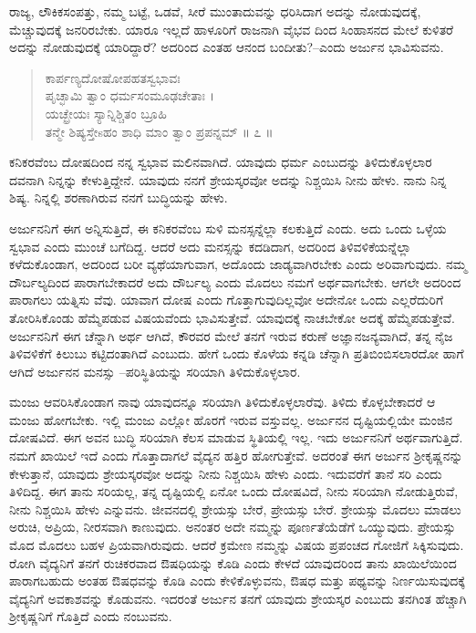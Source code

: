 ರಾಜ್ಯ, ಲೌಕಿಕಸಂಪತ್ತು, ನಮ್ಮ ಬಟ್ಟೆ, ಒಡವೆ, ಸೀರೆ ಮುಂತಾದುವನ್ನು ಧರಿಸಿದಾಗ ಅದನ್ನು ನೋಡುವುದಕ್ಕೆ, ಮೆಚ್ಚುವುದಕ್ಕೆ ಜನರಿರಬೇಕು. ಯಾರೂ ಇಲ್ಲದೆ ಹಾಳೂರಿಗೆ ರಾಜನಾಗಿ ವೈಭವ ದಿಂದ ಸಿಂಹಾಸನದ ಮೇಲೆ ಕುಳಿತರೆ ಅದನ್ನು ನೋಡುವುದಕ್ಕೆ ಯಾರಿದ್ದಾರೆ? ಅದರಿಂದ ಎಂತಹ ಆನಂದ ಬಂದೀತು?–ಎಂದು ಅರ್ಜುನ ಭಾವಿಸುವನು.

\begin{verse}
ಕಾರ್ಪಣ್ಯದೋಷೋಪಹತಸ್ವಭಾವಃ\\ಪೃಚ್ಛಾಮಿ ತ್ವಾಂ ಧರ್ಮಸಂಮೂಢಚೇತಾಃ ।\\ಯಚ್ಛ್ರೇಯಃ ಸ್ಯಾನ್ನಿಶ್ಚಿತಂ ಬ್ರೂಹಿ\\ತನ್ಮೇ ಶಿಷ್ಯಸ್ತೇsಹಂ ಶಾಧಿ ಮಾಂ ತ್ವಾಂ ಪ್ರಪನ್ನಮ್ \num{॥ ೭ ॥}
\end{verse}

{\small ಕನಿಕರವೆಂಬ ದೋಷದಿಂದ ನನ್ನ ಸ್ವಭಾವ ಮಲಿನವಾಗಿದೆ. ಯಾವುದು ಧರ್ಮ ಎಂಬುದನ್ನು ತಿಳಿದುಕೊಳ್ಳಲಾರ ದವನಾಗಿ ನಿನ್ನನ್ನು ಕೇಳುತ್ತಿದ್ದೇನೆ. ಯಾವುದು ನನಗೆ ಶ್ರೇಯಸ್ಕರವೋ ಅದನ್ನು ನಿಶ್ಚಯಿಸಿ ನೀನು ಹೇಳು. ನಾನು ನಿನ್ನ ಶಿಷ್ಯ. ನಿನ್ನಲ್ಲಿ ಶರಣಾಗಿರುವ ನನಗೆ ಬುದ್ಧಿಯನ್ನು ಹೇಳು.}

ಅರ್ಜುನನಿಗೆ ಈಗ ಅನ್ನಿಸುತ್ತಿದೆ, ಈ ಕನಿಕರವೆಂಬ ಸುಳಿ ಮನಸ್ಸನ್ನೆಲ್ಲಾ ಕಲಕುತ್ತಿದೆ ಎಂದು. ಅದು ಒಂದು ಒಳ್ಳೆಯ ಸ್ವಭಾವ ಎಂದು ಮುಂಚೆ ಬಗೆದಿದ್ದ. ಆದರೆ ಅದು ಮನಸ್ಸನ್ನು ಕದಡಿದಾಗ, ಅದರಿಂದ ತಿಳಿವಳಿಕೆಯನ್ನೆಲ್ಲಾ ಕಳೆದುಕೊಂಡಾಗ, ಅದರಿಂದ ಬರೀ ವ್ಯಥೆಯಾಗುವಾಗ, ಅದೊಂದು ಜಾಡ್ಯವಾಗಿರಬೇಕು ಎಂದು ಅರಿವಾಗುವುದು. ನಮ್ಮ ದೌರ್ಬಲ್ಯದಿಂದ ಪಾರಾಗಬೇಕಾದರೆ ಅದು ದೌರ್ಬಲ್ಯ ಎಂದು ಮೊದಲು ನಮಗೆ ಅರ್ಥವಾಗಬೇಕು. ಆಗಲೇ ಅದರಿಂದ ಪಾರಾಗಲು ಯತ್ನಿಸು ವೆವು. ಯಾವಾಗ ದೋಷ ಎಂದು ಗೊತ್ತಾಗುವುದಿಲ್ಲವೋ ಅದೇನೋ ಒಂದು ಎಲ್ಲರೆದುರಿಗೆ ತೋರಿಸಿಕೊಂಡು ಹೆಮ್ಮೆಪಡುವ ವಿಷಯವೆಂದು ಭಾವಿಸುತ್ತೇವೆ. ಯಾವುದಕ್ಕೆ ನಾಚಬೇಕೋ ಅದಕ್ಕೆ ಹೆಮ್ಮೆಪಡುತ್ತೇವೆ. ಅರ್ಜುನನಿಗೆ ಈಗ ಚೆನ್ನಾಗಿ ಅರ್ಥ ಆಗಿದೆ, ಕೌರವರ ಮೇಲೆ ತನಗೆ ಇರುವ ಕರುಣೆ ಅಜ್ಞಾನಜನ್ಯವಾಗಿದೆ, ತನ್ನ ನೈಜ ತಿಳಿವಳಿಕೆಗೆ ಕಿಲುಬು ಕಟ್ಟಿದಂತಾಗಿದೆ ಎಂಬುದು. ಹೇಗೆ ಒಂದು ಕೊಳೆಯ ಕನ್ನಡಿ ಚೆನ್ನಾಗಿ ಪ್ರತಿಬಿಂಬಿಸಲಾರದೋ ಹಾಗೆ ಆಗಿದೆ ಅರ್ಜುನನ ಮನಸ್ಸು –ಪರಿಸ್ಥಿತಿಯನ್ನು ಸರಿಯಾಗಿ ತಿಳಿದುಕೊಳ್ಳಲಾರ.

ಮಂಜು ಆವರಿಸಿಕೊಂಡಾಗ ನಾವು ಯಾವುದನ್ನೂ ಸರಿಯಾಗಿ ತಿಳಿದುಕೊಳ್ಳಲಾರೆವು. ತಿಳಿದು ಕೊಳ್ಳಬೇಕಾದರೆ ಆ ಮಂಜು ಹೋಗಬೇಕು. ಇಲ್ಲಿ ಮಂಜು ಎಲ್ಲೋ ಹೊರಗೆ ಇರುವ ವಸ್ತುವಲ್ಲ. ಅರ್ಜುನನ ದೃಷ್ಟಿಯಲ್ಲಿಯೇ ಮಂಜಿನ ದೋಷವಿದೆ. ಈಗ ಅವನ ಬುದ್ಧಿ ಸರಿಯಾಗಿ ಕೆಲಸ ಮಾಡುವ ಸ್ಥಿತಿಯಲ್ಲಿ ಇಲ್ಲ. ಇದು ಅರ್ಜುನನಿಗೆ ಅರ್ಥವಾಗುತ್ತಿದೆ. ನಮಗೆ ಖಾಯಿಲೆ ಇದೆ ಎಂದು ಗೊತ್ತಾದಾಗಲೆ ವೈದ್ಯನ ಹತ್ತಿರ ಹೋಗುತ್ತೇವೆ. ಅದರಂತೆ ಈಗ ಅರ್ಜುನ ಶ್ರೀಕೃಷ್ಣನನ್ನು ಕೇಳುತ್ತಾನೆ, ಯಾವುದು ಶ್ರೇಯಸ್ಕರವೋ ಅದನ್ನು ನೀನು ನಿಶ್ಚಯಿಸಿ ಹೇಳು ಎಂದು. ಇದುವರೆಗೆ ತಾನೆ ಸರಿ ಎಂದು ತಿಳಿದಿದ್ದ. ಈಗ ತಾನು ಸರಿಯಲ್ಲ, ತನ್ನ ದೃಷ್ಟಿಯಲ್ಲಿ ಏನೋ ಒಂದು ದೋಷವಿದೆ, ನೀನು ಸರಿಯಾಗಿ ನೋಡುತ್ತಿರುವೆ, ನೀನು ನಿಶ್ಚಯಿಸಿ ಹೇಳು ಎನ್ನುವನು. ಜೀವನದಲ್ಲಿ ಶ್ರೇಯಸ್ಸು ಬೇರೆ, ಪ್ರೇಯಸ್ಸು ಬೇರೆ. ಶ್ರೇಯಸ್ಸು ಮೊದಲು ಮಾಡಲು ಅರುಚಿ, ಅಪ್ರಿಯ, ನೀರಸವಾಗಿ ಕಾಣುವುದು. ಅನಂತರ ಅದೇ ನಮ್ಮನ್ನು ಪೂರ್ಣತೆಯೆಡೆಗೆ ಒಯ್ಯುವುದು. ಪ್ರೇಯಸ್ಸು ಮೊದ ಮೊದಲು ಬಹಳ ಪ್ರಿಯವಾಗಿರುವುದು. ಆದರೆ ಕ್ರಮೇಣ ನಮ್ಮನ್ನು ವಿಷಯ ಪ್ರಪಂಚದ ಗೋಜಿಗೆ ಸಿಕ್ಕಿಸುವುದು. ರೋಗಿ ವೈದ್ಯನಿಗೆ ತನಗೆ ರುಚಿಕರವಾದ ಔಷಧಿಯನ್ನು ಕೊಡಿ ಎಂದು ಕೇಳದೆ ಯಾವುದರಿಂದ ತಾನು ಖಾಯಿಲೆಯಿಂದ ಪಾರಾಗಬಹುದು ಅಂತಹ ಔಷಧವನ್ನು ಕೊಡಿ ಎಂದು ಕೇಳಿಕೊಳ್ಳುವನು, ಔಷಧ ಮತ್ತು ಪಥ್ಯವನ್ನು ನಿರ್ಣಯಿಸುವುದಕ್ಕೆ ವೈದ್ಯನಿಗೆ ಅವಕಾಶವನ್ನು ಕೊಡುವನು. ಇದರಂತೆ ಅರ್ಜುನ ತನಗೆ ಯಾವುದು ಶ್ರೇಯಸ್ಕರ ಎಂಬುದು ತನಗಿಂತ ಹೆಚ್ಚಾಗಿ ಶ್ರೀಕೃಷ್ಣನಿಗೆ ಗೊತ್ತಿದೆ ಎಂದು ನಂಬುವನು.

